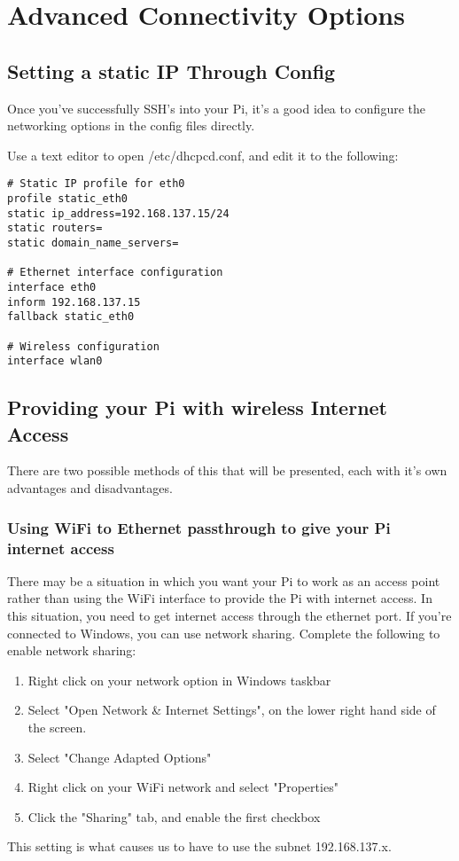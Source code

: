 \section{Advanced Connectivity Options}
\subsection{Setting a static IP Through Config}
Once you've successfully SSH's into your Pi, it's a good idea to configure the networking options in the config files directly.

Use a text editor to open /etc/dhcpcd.conf, and edit it to the following:
\begin{verbatim}
# Static IP profile for eth0
profile static_eth0
static ip_address=192.168.137.15/24
static routers=
static domain_name_servers=

# Ethernet interface configuration 
interface eth0
inform 192.168.137.15
fallback static_eth0

# Wireless configuration
interface wlan0
\end{verbatim}

\subsection{Providing your Pi with wireless Internet Access}
There are two possible methods of this that will be presented, each with it's own advantages and disadvantages.
\subsubsection{Using WiFi to Ethernet passthrough to give your Pi internet access}
There may be a situation in which you want your Pi to work as an access point rather than using the WiFi interface to provide the Pi with internet access. In this situation, you need to get internet access through the ethernet port. If you're connected to Windows, you can use network sharing. Complete the following to enable network sharing:

\begin{enumerate}
    \item Right click on your network option in Windows taskbar
    \item Select  "Open Network \& Internet Settings", on the lower right hand side of the screen.
    \item Select "Change Adapted Options"
    \item Right click on your WiFi network and select "Properties"
    \item Click the "Sharing" tab, and enable the first checkbox
\end{enumerate}
This setting is what causes us to have to use the subnet 192.168.137.x.


